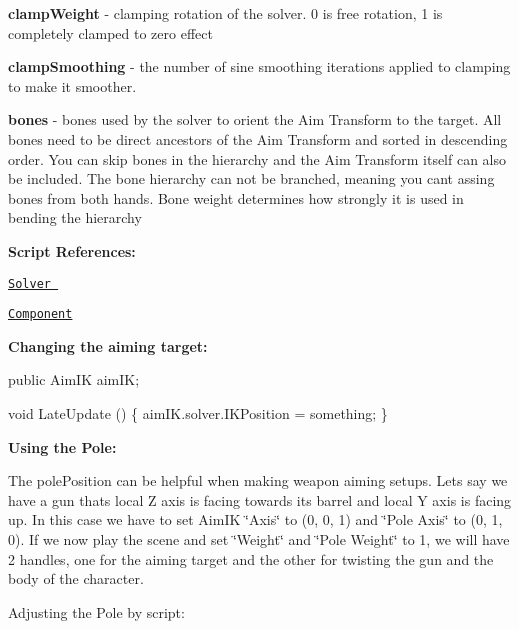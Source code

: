 \begin{DoxyItemize}
\item {\bfseries clamp\+Weight} -\/ clamping rotation of the solver. 0 is free rotation, 1 is completely clamped to zero effect
\item {\bfseries clamp\+Smoothing} -\/ the number of sine smoothing iterations applied to clamping to make it smoother.
\item {\bfseries bones} -\/ bones used by the solver to orient the Aim Transform to the target. All bones need to be direct ancestors of the Aim Transform and sorted in descending order. You can skip bones in the hierarchy and the Aim Transform itself can also be included. The bone hierarchy can not be branched, meaning you cant assing bones from both hands. Bone weight determines how strongly it is used in bending the hierarchy
\end{DoxyItemize}



{\bfseries Script References\+:}
\begin{DoxyItemize}
\item \href{http://www.root-motion.com/finalikdox/html/class_root_motion_1_1_final_i_k_1_1_i_k_solver_aim.html}{\tt Solver }
\item \href{http://www.root-motion.com/finalikdox/html/class_root_motion_1_1_final_i_k_1_1_aim_i_k.html}{\tt Component}
\end{DoxyItemize}

{\bfseries Changing the aiming target\+:}


\begin{DoxyCode}
\textcolor{keyword}{public} AimIK aimIK;

\textcolor{keywordtype}{void} LateUpdate () \{
    aimIK.solver.IKPosition = something;
\}
\end{DoxyCode}


{\bfseries Using the Pole\+:}

The pole\+Position can be helpful when making weapon aiming setups. Let\textquotesingle{}s say we have a gun that\textquotesingle{}s local Z axis is facing towards it\textquotesingle{}s barrel and local Y axis is facing up. In this case we have to set Aim\+IK \char`\"{}\+Axis\char`\"{} to (0, 0, 1) and \char`\"{}\+Pole Axis\char`\"{} to (0, 1, 0). If we now play the scene and set \char`\"{}\+Weight\char`\"{} and \char`\"{}\+Pole Weight\char`\"{} to 1, we will have 2 handles, one for the aiming target and the other for twisting the gun and the body of the character.

Adjusting the Pole by script\+:


